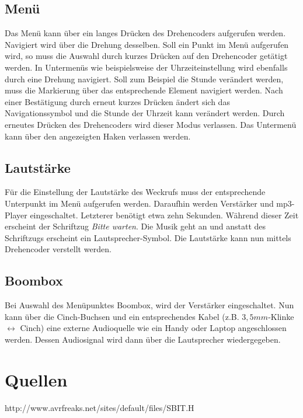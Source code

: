 \documentclass[journal, a4paper]{IEEEtran}
\begin{document}
\subsection{Menü}
Das Menü kann über ein langes Drücken des Drehencoders aufgerufen werden. Navigiert wird über die Drehung desselben. Soll ein Punkt im Menü aufgerufen wird, so muss die Auswahl durch kurzes Drücken auf den Drehencoder getätigt werden. In Untermenüs wie beispielsweise der Uhrzeiteinstellung wird ebenfalls durch eine Drehung navigiert. Soll zum Beispiel die Stunde verändert werden, muss die Markierung über das entsprechende Element navigiert werden. Nach einer Bestätigung durch erneut kurzes Drücken ändert sich das Navigationssymbol und die Stunde der Uhrzeit kann verändert werden. Durch erneutes Drücken des Drehencoders wird dieser Modus verlassen. Das Untermenü kann über den angezeigten Haken verlassen werden.
\subsection{Lautstärke}
Für die Einstellung der Lautstärke des Weckrufs muss der entsprechende Unterpunkt im Menü aufgerufen werden. Daraufhin werden Verstärker und mp3-Player eingeschaltet. Letzterer benötigt etwa zehn Sekunden. Während dieser Zeit erscheint der Schriftzug \emph{\glqq Bitte warten\grqq}. Die Musik geht an und anstatt des Schriftzugs erscheint ein Lautsprecher-Symbol. Die Lautstärke kann nun mittels Drehencoder verstellt werden.
\subsection{Boombox}
Bei Auswahl des Menüpunktes Boombox, wird der Verstärker eingeschaltet. Nun kann über die Cinch-Buchsen und ein entsprechendes Kabel (z.B. $3,5mm$-Klinke $\leftrightarrow$ Cinch) eine externe Audioquelle wie ein Handy oder Laptop angeschlossen werden. Dessen Audiosignal wird dann über die Lautsprecher wiedergegeben.
\section{Quellen}
http://www.avrfreaks.net/sites/default/files/SBIT.H
\end{document}
